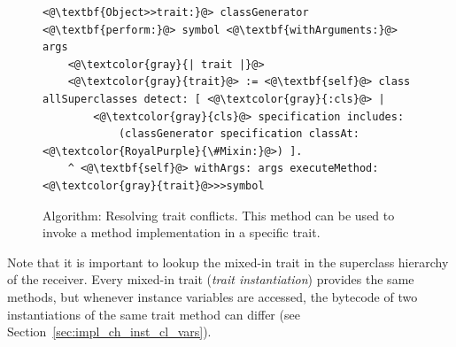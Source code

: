 \begin{figure}[!htp]
\begin{lstlisting}
<@\textbf{Object>>trait:}@> classGenerator <@\textbf{perform:}@> symbol <@\textbf{withArguments:}@> args
    <@\textcolor{gray}{| trait |}@>
    <@\textcolor{gray}{trait}@> := <@\textbf{self}@> class allSuperclasses detect: [ <@\textcolor{gray}{:cls}@> |
        <@\textcolor{gray}{cls}@> specification includes: 
            (classGenerator specification classAt: <@\textcolor{RoyalPurple}{\#Mixin:}@>) ].
    ^ <@\textbf{self}@> withArgs: args executeMethod: <@\textcolor{gray}{trait}@>>>symbol
\end{lstlisting}
\caption[Algorithm: Resolving trait conflicts]{Algorithm: Resolving trait conflicts. This method can be used to invoke a method implementation in a specific trait.}
\label{fig:algo_trait_res}
\end{figure}

Note that it is important to lookup the mixed-in trait in the superclass hierarchy of the receiver. Every mixed-in trait (\emph{trait instantiation}) provides the same methods, but whenever instance variables are accessed, the bytecode of two instantiations of the same trait method can differ (see Section~\ref{sec:impl_ch_inst_cl_vars}).


